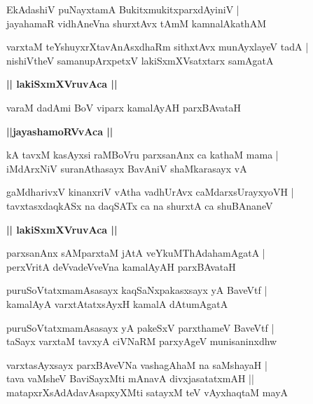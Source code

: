 \documentclass[twoside,12pt,openright]{book}
\newcounter{shloka}[chapter]
\def\uvaca#1{\centerline{{\large\textbf{#1}}}}
\begin{document}
\begin{shloka}%
EkAdashiV puNayxtamA BukitxmukitxparxdAyiniV |\\
jayahamaR vidhAneVna shurxtAvx tAmM kamnalAkathAM 
\end{shloka}

\begin{shloka}%
varxtaM teYshuyxrXtavAnAsxdhaRm sithxtAvx munAyxlayeV tadA |\\
nishiVtheV samanupArxpetxV lakiSxmXVsatxtarx samAgatA 
\end{shloka}

\uvaca{|| lakiSxmXVruvAca ||}

\begin{shloka}%
varaM dadAmi BoV viparx kamalAyAH parxBAvataH
\end{shloka}

\uvaca{||jayashamoRVvAca ||}

\begin{shloka}%
kA tavxM kasAyxsi raMBoVru parxsanAnx ca kathaM mama |\\
iMdArxNiV suranAthasayx BavAniV shaMkarasayx vA
\end{shloka}

\begin{shloka}%
gaMdharivxV kinanxriV vAtha vadhUrAvx caMdarxsUrayxyoVH |\\
tavxtasxdaqkASx na daqSATx ca na shurxtA ca shuBAnaneV 
\end{shloka}

\uvaca{|| lakiSxmXVruvAca ||}

\begin{shloka}%
parxsanAnx sAMparxtaM jAtA veYkuMThAdahamAgatA |\\
perxVritA deVvadeVveVna kamalAyAH parxBAvataH
\end{shloka}

\begin{shloka}%
puruSoVtatxmamAsasayx kaqSaNxpakasxsayx yA BaveVtf |\\
kamalAyA varxtAtatxsAyxH kamalA dAtumAgatA
\end{shloka}

\begin{shloka}%
puruSoVtatxmamAsasayx yA pakeSxV parxthameV BaveVtf |\\
taSayx varxtaM tavxyA ciVNaRM parxyAgeV munisaninxdhw
\end{shloka}

\begin{shloka}%
varxtasAyxsayx parxBAveVNa vashagAhaM na saMshayaH |\\
tava vaMsheV BaviSayxMti mAnavA divxjasatatxmAH ||\\
matapxrXsAdAdavAsapxyXMti satayxM teV vAyxhaqtaM mayA 
\end{shloka}
\end{document}
